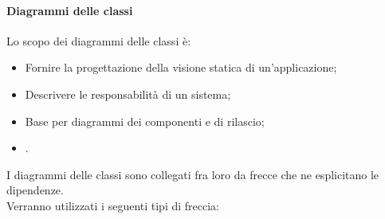 \paragraph{Diagrammi delle classi}\Spazio
Lo scopo dei diagrammi delle classi è:
\begin{itemize}
	\item Fornire la progettazione della visione statica di un'applicazione;
	\item Descrivere le responsabilità di un sistema;
	\item Base per diagrammi dei componenti e di rilascio;
	\item {}.
\end{itemize}
I diagrammi delle classi sono collegati fra loro da frecce che ne esplicitano le dipendenze. \\
Verranno utilizzati i seguenti tipi di freccia:
